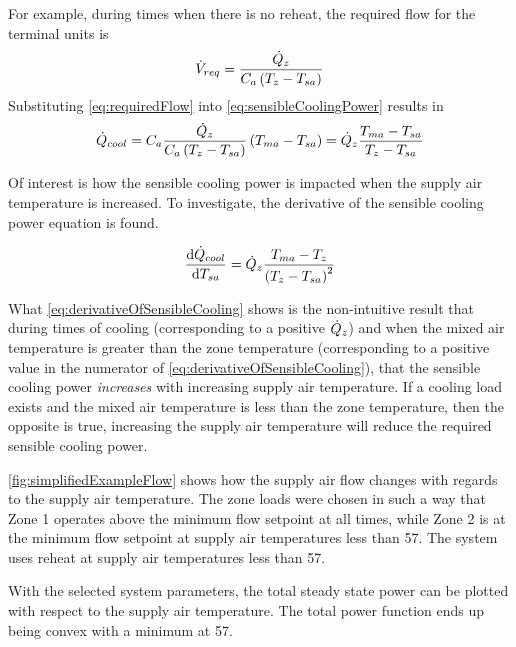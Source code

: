 For example, during times when there is no reheat, the required flow for
the terminal units is 
\begin{equation}\label{eq:requiredFlow}
    \dot{V}_{req} = \frac{\dot{Q}_{z}}{C_{a} \left(T_{z} - T_{sa}\right)}
\end{equation}
%
Substituting  \ref{eq:requiredFlow} into  
 \ref{eq:sensibleCoolingPower} results in
%
\begin{equation}
    \dot{Q}_{cool} = C_{a}  \frac{\dot{Q}_{z}}{C_{a} \left(T_{z} -
    T_{sa}\right)}\left(T_{ma} - T_{sa}\right) = \dot{Q}_{z}
    \frac{T_{ma} - T_{sa}}{T_{z} - T_{sa}}
\end{equation}


Of interest is how the sensible cooling power is impacted when
the supply air temperature is increased. To investigate, the derivative
of the sensible cooling power equation is found.

\begin{equation}\label{eq:derivativeOfSensibleCooling}
    \dv{\dot{Q}_{cool}}{T_{sa}} = \dot{Q}_{z} \frac{T_{ma} -
    T_{z}}{\left(T_{z} - T_{sa}\right)^{2}}
\end{equation}

What  \ref{eq:derivativeOfSensibleCooling} shows is the
non-intuitive result that during times of cooling (corresponding to a
positive \(\dot{Q}_{z}\)) and when the mixed air temperature is
greater than the zone temperature (corresponding to a positive value in
the numerator of  \ref{eq:derivativeOfSensibleCooling}), that
the sensible cooling power \textit{increases} with increasing supply air
temperature. If a cooling load exists and the mixed air temperature is
less than the zone temperature, then the opposite is true, increasing
the supply air temperature will reduce the required sensible cooling
power.

\figref{} \ref{fig:simplifiedExampleFlow} shows how the supply air flow
changes with regards to the supply air temperature. The zone loads were
chosen in such a way that Zone 1 operates above the minimum flow
setpoint at all times, while Zone 2 is at the minimum flow setpoint at
supply air temperatures less than \SI{57}{\degreeF}. The system uses
reheat at supply air temperatures less than \SI{57}{\degreeF}. 

With the selected system parameters, the total steady state power can be
plotted with respect to the supply air temperature. The total power
function ends up being convex with a minimum at \SI{57}{\degreeF}. 

